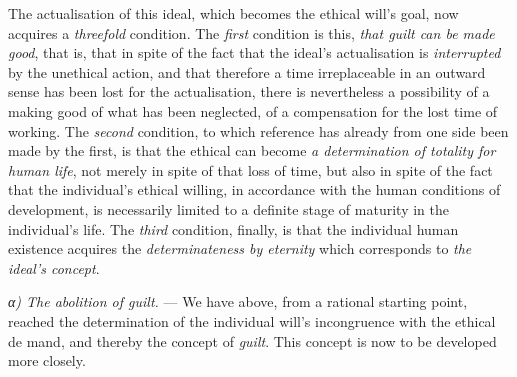 \documentclass[12pt,a4paper]{book}
\begin{document}
The actualisation of this ideal, which becomes the ethical will's goal, now
acquires a \emph{threefold} condition. The \emph{first} condition is this,
\emph{that guilt can be made good}, that is, that in spite of the fact that the
ideal's actualisation is \emph{interrupted} by the unethical action, and that
therefore a time irreplaceable in an outward sense has been lost for the
actualisation, there is nevertheless a possibility of a making good of what has
been neglected, of a compensation for the lost time of working. The
\emph{second} condition, to which reference has already from one side been made
by the first, is that the ethical can become \emph{a determination of totality
for human life}, not merely in spite of that loss of time, but also in spite of
the fact that the individual's ethical willing, in accordance with the human
conditions of development, is necessarily limited to a definite stage of
maturity in the individual's life. The \emph{third} condition, finally, is that
the individual human existence acquires the \emph{determinateness by eternity}
which corresponds to \emph{the ideal's concept}.

\emph{α) The abolition of guilt.} --- We have above, from a rational starting
point, reached the determination of the individual will's incongruence with the
ethical de\-%
mand, and thereby the concept of \emph{guilt}. This concept is now to be
developed more closely.
\end{document}
